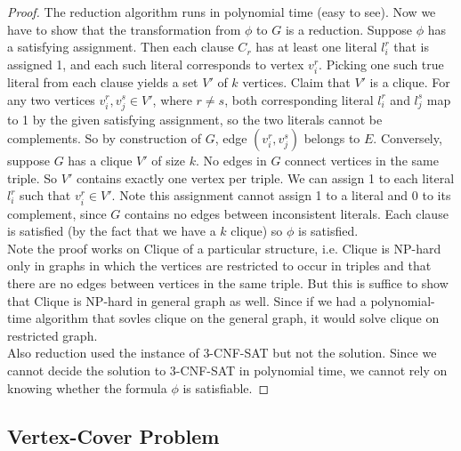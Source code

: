 \documentclass[11pt]{article}
\begin{document}
\begin{theorem*}
\begin{enumerate}
\begin{proof}
            The reduction algorithm runs in polynomial time (easy to see). Now we have to show that the transformation from $\phi$ to $G$ is a reduction. Suppose $\phi$ has a satisfying assignment. Then each clause $C_r$ has at least one literal $l_i^r$ that is assigned 1, and each such literal corresponds to vertex $v_i^r$. Picking one such true literal from each clause yields a set $V'$ of $k$ vertices. Claim that $V'$ is a clique. For any two vertices $v_i^r, v_j^s\in V'$, where $r\neq s$, both corresponding literal $l_i^r$ and $l_j^s$ map to 1 by the given satisfying assignment, so the two literals cannot be complements. So by construction of $G$, edge $(v_i^r, v_j^s)$ belongs to $E$. Conversely, suppose $G$ has a clique $V'$ of size $k$. No edges in $G$ connect vertices in the same triple. So $V'$ contains exactly one vertex per triple. We can assign 1 to each literal $l_i^r$ such that $v_i^r \in V'$. Note this assignment cannot assign 1 to a literal and 0 to its complement, since $G$ contains no edges between inconsistent literals. Each clause is satisfied (by the fact that we have a $k$ clique) so $\phi$ is satisfied.\\
            Note the proof works on Clique of a particular structure, i.e. Clique is NP-hard only in graphs in which the vertices are restricted to occur in triples and that there are no edges between vertices in the same triple. But this is suffice to show that Clique is NP-hard in general graph as well. Since if we had a polynomial-time algorithm that sovles clique on the general graph, it would solve clique on restricted graph. \\
            Also reduction used the instance of \textsc{3-CNF-SAT} but not the solution. Since we cannot decide the solution to \textsc{3-CNF-SAT} in polynomial time, we cannot rely on knowing whether the formula $\phi$ is satisfiable.
        \end{proof}
    \end{enumerate}
\end{theorem*}



\subsection*{Vertex-Cover Problem}
\end{document}
